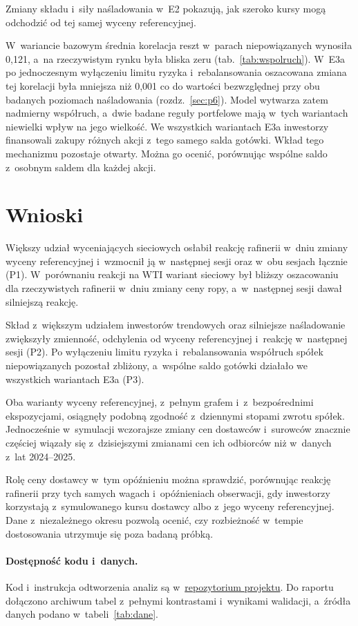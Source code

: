 \documentclass[11pt,a4paper]{article}
\begin{document}
Zmiany składu i~siły naśladowania w~E2 pokazują, jak szeroko kursy mogą odchodzić od tej samej wyceny
referencyjnej.

W~wariancie bazowym średnia korelacja reszt w~parach niepowiązanych wynosiła 0,121, a~na rzeczywistym
rynku była bliska zeru (tab.~\ref{tab:wspolruch}). W~E3a po jednoczesnym wyłączeniu limitu ryzyka
i~rebalansowania oszacowana zmiana tej korelacji była mniejsza niż 0,001 co do wartości bezwzględnej przy obu
badanych poziomach naśladowania (rozdz.~\ref{sec:p6}).
Model wytwarza zatem nadmierny współruch, a~dwie badane reguły portfelowe mają w~tych wariantach niewielki
wpływ na jego wielkość. We wszystkich wariantach E3a inwestorzy finansowali zakupy różnych akcji z~tego samego
salda gotówki. Wkład tego mechanizmu pozostaje otwarty. Można go ocenić, porównując wspólne saldo z~osobnym
saldem dla każdej akcji.

\section{Wnioski}
Większy udział wyceniających sieciowych osłabił reakcję rafinerii w~dniu zmiany wyceny referencyjnej i~wzmocnił ją
w~następnej sesji oraz w~obu sesjach łącznie (P1). W~porównaniu reakcji na WTI wariant sieciowy był bliższy
oszacowaniu dla rzeczywistych rafinerii w~dniu zmiany ceny ropy, a~w~następnej sesji dawał silniejszą reakcję.

Skład z~większym udziałem inwestorów trendowych oraz silniejsze naśladowanie zwiększyły zmienność, odchylenia
od wyceny referencyjnej i~reakcję w~następnej sesji (P2). Po wyłączeniu limitu ryzyka i~rebalansowania
współruch spółek niepowiązanych pozostał zbliżony, a~wspólne saldo gotówki działało we wszystkich wariantach E3a (P3).

Oba warianty wyceny referencyjnej, z~pełnym grafem i~z~bezpośrednimi ekspozycjami, osiągnęły podobną zgodność
z~dziennymi stopami zwrotu spółek. Jednocześnie w~symulacji wczorajsze zmiany cen dostawców i~surowców znacznie
częściej wiązały się z~dzisiejszymi zmianami cen ich odbiorców niż w~danych z~lat 2024--2025.

Rolę ceny dostawcy w~tym opóźnieniu można sprawdzić, porównując reakcję rafinerii przy tych samych wagach
i~opóźnieniach obserwacji, gdy inwestorzy korzystają z~symulowanego kursu dostawcy albo z~jego wyceny
referencyjnej. Dane z~niezależnego okresu pozwolą ocenić, czy rozbieżność w~tempie dostosowania utrzymuje
się poza badaną próbką.

\paragraph{Dostępność kodu i~danych.}
Kod i~instrukcja odtworzenia analiz są w~\href{https://github.com/dmitrykitty/stock-exchange-simulation}{repozytorium projektu}.
Do raportu dołączono archiwum tabel z~pełnymi kontrastami i~wynikami walidacji, a~źródła danych podano
w~tabeli~\ref{tab:dane}.
\end{document}
